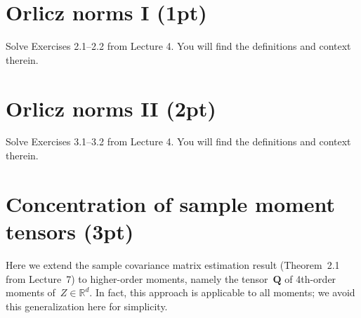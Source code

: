 \documentclass[11pt]{article}
\newcommand{\R}{\mathds{R}}
\newcommand{\E}{\mathds{E}}
\newcommand{\cN}{\mathcal{N}}
\begin{document}
\newpage
\section{Orlicz norms I (1pt)}
Solve Exercises 2.1--2.2 from Lecture 4. You will find the definitions and context therein.


\newpage
\section{Orlicz norms II (2pt)}
Solve Exercises 3.1--3.2 from Lecture 4. You will find the definitions and context therein.

\newpage
\section{Concentration of sample moment tensors (3pt)} 
\newcommand{\bT}{\boldsymbol{T}}
\newcommand{\bQ}{\boldsymbol{Q}}
\newcommand{\bA}{\boldsymbol{A}}
Here we extend the sample covariance matrix estimation result (Theorem~2.1 from Lecture~7) to higher-order moments, namely the tensor~$\bQ$ of 4th-order moments of~$Z \in \R^d$.
In fact, this approach is applicable to all moments; we avoid this generalization here for simplicity.
\end{document}
